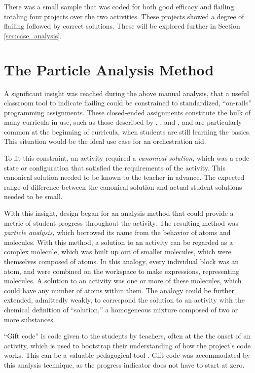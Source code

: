 There was a small sample that was coded for both good efficacy and flailing, totaling four projects over the two activities. These projects showed a degree of flailing followed by correct solutions. These will be explored further in Section \ref{sec:case_analysis}.



\section{The Particle Analysis Method}
\label{sec:particle-analysis}

A significant insight was reached during the above manual analysis, that a useful classroom tool to indicate flailing could be constrained to standardized, ``on-rails'' programming assignments. These closed-ended assignments constitute the bulk of many curricula in use, such as those described by  \citet{gray2012teaching}, \citet{martin2015dual}, and \citet{morelli2015analyzing}, and are particularly common at the beginning of curricula, when students are still learning the basics. This situation would be the ideal use case for an orchestration aid. 

To fit this constraint, an activity required a \emph{canonical solution,} which was a code state or configuration that satisfied the requirements of the activity. This canonical solution needed to be known to the teacher in advance. The expected range of difference between the canonical solution and actual student solutions needed to be small.

With this insight, design began for an analysis method that could provide a metric of student progress throughout the activity. The resulting method was \emph{particle analysis,} which borrowed its name from the behavior of atoms and molecules. With this method, a solution to an activity can be regarded as a complex molecule, which was built up out of smaller molecules, which were themselves composed of atoms. In this analogy, every individual block was an atom, and were combined on the workspace to make expressions, representing molecules. A solution to an activity was one or more of these molecules, which could have any number of atoms within them. The analogy could be further extended, admittedly weakly, to correspond the solution to an activity with the chemical definition of ``solution,'' a homogeneous mixture composed of two or more substances. 

``Gift code'' is code given to the students by teachers, often at the the onset of an activity, which is used to bootstrap their understanding of how the project's code works. This can be a valuable pedagogical tool \citep{martin-gift-code}. Gift code was accommodated by this analysis technique, as the progress indicator does not have to start at zero.

